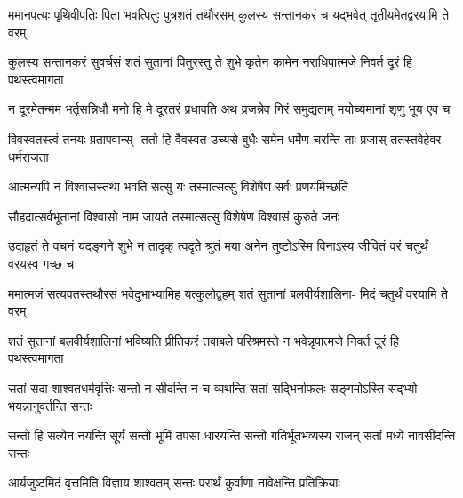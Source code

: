 \begin{center}



\fourlineindentedshloka
{ममानपत्यः पृथिवीपतिः पिता}
{भवत्पितुः पुत्रशतं तथौरसम्}
{कुलस्य सन्तानकरं च यद्भवेत्}
{तृतीयमेतद्वरयामि ते वरम्}




\fourlineindentedshloka
{कुलस्य सन्तानकरं सुवर्चसं}
{शतं सुतानां पितुरस्तु ते शुभे}
{कृतेन कामेन नराधिपात्मजे}
{निवर्त दूरं हि पथस्त्वमागता}




\fourlineindentedshloka
{न दूरमेतन्मम भर्तृसन्निधौ}
{मनो हि मे दूरतरं प्रधावति}
{अथ व्रजन्नेव गिरं समुद्यताम्}
{मयोच्यमानां शृणु भूय एव च}


\fourlineindentedshloka
{विवस्वतस्त्वं तनयः प्रतापवान्स्-}
{ततो हि वैवस्वत उच्यसे बुधैः}
{समेन धर्मेण चरन्ति ताः प्रजास्}
{ततस्तवेहेवर धर्मराजता}


\twolineshloka
{आत्मन्यपि न विश्वासस्तथा भवति सत्सु यः}
{तस्मात्सत्सु विशेषेण सर्वः प्रणयमिच्छति}


\twolineshloka
{सौहदात्सर्वभूतानां विश्वासो नाम जायते}
{तस्मात्सत्सु विशेषेण विश्वासं कुरुते जनः}



\fourlineindentedshloka
{उदाहृतं ते वचनं यदङ्गने}
{शुभे न तादृक् त्वदृते श्रुतं मया}
{अनेन तुष्टोऽस्मि विनाऽस्य जीवितं}
{वरं चतुर्थं वरयस्व गच्छ च}




\fourlineindentedshloka
{ममात्मजं सत्यवतस्तथौरसं}
{भवेदुभाभ्यामिह यत्कुलोद्वहम्}
{शतं सुतानां बलवीर्यशालिना-}
{मिदं चतुर्थं वरयामि ते वरम्}



\fourlineindentedshloka
{शतं सुतानां बलवीर्यशालिनां}
{भविष्यति प्रीतिकरं तवाबले}
{परिश्रमस्ते न भवेन्नृपात्मजे}
{निवर्त दूरं हि पथस्त्वमागता}




\fourlineindentedshloka
{सतां सदा शाश्वतधर्मवृत्तिः}
{सन्तो न सीदन्ति न च व्यथन्ति}
{सतां सद्भिर्नाफलः सङ्गमोऽस्ति}
{सद्भ्यो भयन्नानुवर्तन्ति सन्तः}


\fourlineindentedshloka
{सन्तो हि सत्येन नयन्ति सूर्यं}
{सन्तो भूमिं तपसा धारयन्ति}
{सन्तो गतिर्भूतभव्यस्य राजन्}
{सतां मध्ये नावसीदन्ति सन्तः}


\twolineshloka
{आर्यजुष्टमिदं वृत्तमिति विज्ञाय शाश्वतम्}
{सन्तः परार्थं कुर्वाणा नावेक्षन्ति प्रतिक्रियाः}



\end{center}
